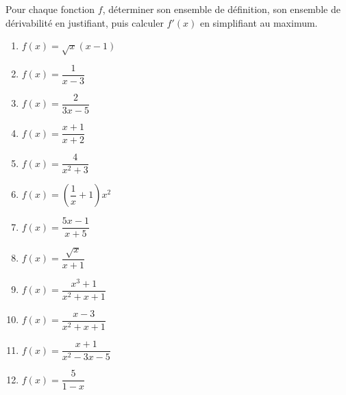\documentclass[a4paper,12pt]{article}
\begin{document}
\begin{exercice}[title=Exercice 14 $\quad \star \star \quad$ {[Calculer]}]
Pour chaque fonction $f$, déterminer son ensemble de définition, son ensemble de dérivabilité en justifiant, puis calculer $f'(x)$ en simplifiant au maximum.
\begin{enumerate}
    \item $f(x) = \sqrt{x}(x - 1)$
    \item $f(x) = \dfrac{1}{x - 3}$
    \item $f(x) = \dfrac{2}{3x - 5}$
    \item $f(x) = \dfrac{x + 1}{x + 2}$
    \item $f(x) = \dfrac{4}{x^2 + 3}$
    \item $f(x) = \left(\dfrac{1}{x} + 1\right)x^2$
    \item $f(x) = \dfrac{5x - 1}{x + 5}$
    \item $f(x) = \dfrac{\sqrt{x}}{x + 1}$
    \item $f(x) = \dfrac{x^3 + 1}{x^2 + x + 1}$
    \item $f(x) = \dfrac{x - 3}{x^2 + x + 1}$
    \item $f(x) = \dfrac{x + 1}{x^2 - 3x - 5}$
    \item $f(x) = \dfrac{5}{1 - x}$
\end{enumerate}
\end{exercice}
\end{document}
